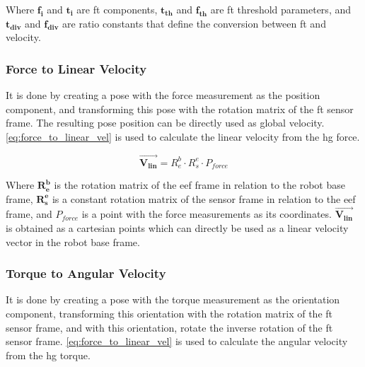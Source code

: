 \noindent Where $\mathbf{f_i}$ and $\mathbf{t_i}$ are \ac{ft} components, $\mathbf{t_{th}}$ and $\mathbf{f_{th}}$ are \ac{ft} threshold parameters, and $\mathbf{t_{div}}$ and $\mathbf{f_{div}}$ are ratio constants that define the conversion between \ac{ft} and velocity.

\subsubsection{Force to Linear Velocity}


\par It is done by creating a pose with the force measurement as the position component, and transforming this pose with the rotation matrix of the \ac{ft} sensor frame. The resulting pose position can be directly used as global velocity. \autoref{eq:force_to_linear_vel} is used to calculate the linear velocity from the \ac{hg} force.

\begin{equation}
    \vec{\mathbf{V_{lin}}} = R^b_e \cdot R^e_s \cdot P_{force}
    \label{eq:force_to_linear_vel}
\end{equation}

\noindent Where $\mathbf{R^b_e}$ is the rotation matrix of the \ac{eef} frame in relation to the robot base frame, $\mathbf{R^e_s}$ is a constant rotation matrix of the sensor frame in relation to the \ac{eef} frame, and $P_{force}$ is a point with the force measurements as its coordinates. $\vec{\mathbf{V_{lin}}}$ is obtained as a cartesian points which can directly be used as a linear velocity vector in the robot base frame.

\subsubsection{Torque to Angular Velocity}


\par It is done by creating a pose with the torque measurement as the orientation component, transforming this orientation with the rotation matrix of the \ac{ft} sensor frame, and with this orientation, rotate the inverse rotation of the \ac{ft} sensor frame. \autoref{eq:force_to_linear_vel} is used to calculate the angular velocity from the \ac{hg} torque.

